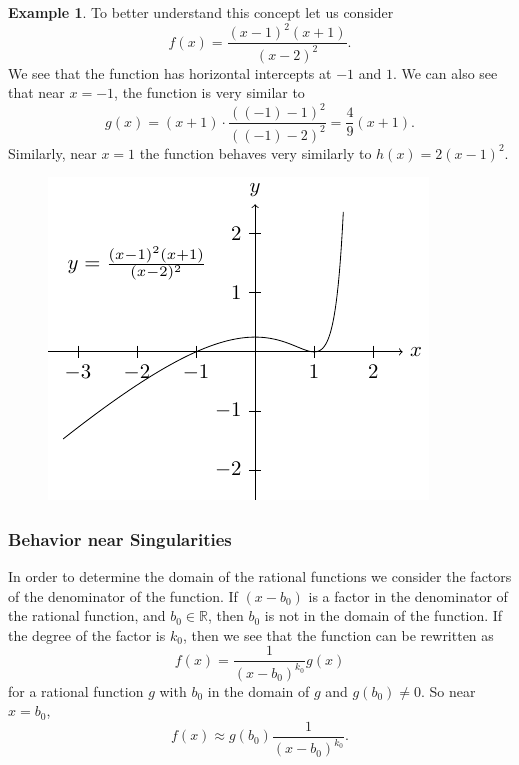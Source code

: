 \documentclass[
]{book}
\theoremstyle{definition}
\theoremstyle{definition}
\newtheorem{example}{Example}[chapter]
\theoremstyle{definition}
\theoremstyle{remark}
\begin{document}
\begin{example}
\protect\hypertarget{exm:unnamed-chunk-226}{}{\label{exm:unnamed-chunk-226} }To better understand this concept let us consider \[f(x)=\frac{(x-1)^2(x+1)}{(x-2)^2}.\]
We see that the function has horizontal intercepts at \(-1\) and \(1\). We can also see that near \(x=-1\), the function is very similar to \[g(x)= (x+1) \cdot \frac{ ((-1)-1)^2}{((-1)-2)^2}= \frac{4}{9} (x+1).\] Similarly, near \(x=1\) the function behaves very similarly to \(h(x)= 2(x-1)^2\).
\end{example}
\begin{figure}

{\centering \includegraphics[width=0.5\linewidth]{tikz/rational1} 

}

\end{figure}

\hypertarget{behavior-near-singularities}{%
\subsubsection{Behavior near Singularities}\label{behavior-near-singularities}}

In order to determine the domain of the rational functions we consider the factors of the denominator of the function. If \((x-b_0)\) is a factor in the denominator of the rational function, and \(b_0\in \mathbb{R}\), then \(b_0\) is not in the domain of the function. If the degree of the factor is \(k_0\), then we see that the function can be rewritten as \[f(x)= \frac{1}{(x-b_0)^{k_0}} g(x)\] for a rational function \(g\) with \(b_0\) in the domain of \(g\) and \(g(b_0)\neq 0\). So near \(x=b_0\), \[f(x) \approx g(b_0) \frac{1}{(x-b_0)^{k_0}}.\]
\end{document}
